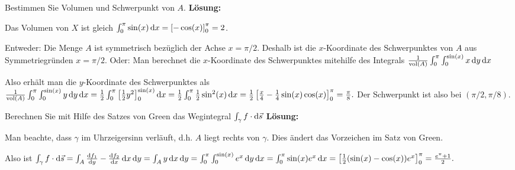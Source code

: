 \documentclass[a4paper,10pt]{article}
\begin{document}
Bestimmen Sie Volumen und Schwerpunkt von \( A \).
\textbf{Lösung:}
\begin{enumerate*}
    \item Das Volumen von \( X \) ist gleich \( \int_0^\pi \sin(x) \odif{x} = \left[ -\cos(x) \right]_0^\pi = 2 \).
    \item Entweder: Die Menge \( A \) ist symmetrisch bezüglich der Achse \( x = \pi / 2 \). Deshalb ist die \( x \)-Koordinate des Schwerpunktes von \( A \) aus Symmetriegründen \( x = \pi/2\).
    Oder: Man berechnet die \( x \)-Koordinate des Schwerpunktes mitehilfe des Integrals
    \(
        \frac{1}{\operatorname{vol}(A)} \int_0^\pi \int_0^{\sin(x)} x \odif{y, x}
    \)
    \item Also erhält man die \( y \)-Koordinate des Schwerpunktes als
    \(
        \frac{1}{\operatorname{vol}(A)} \int_0^\pi \int_0^{\sin(x)} y \odif{y, x} = \frac{1}{2} \int_0^\pi \left[ \frac{1}{2} y^2 \right]_0^{\sin(x)} \odif{x} = \frac{1}{2} \int_0^\pi \frac{1}{2} \sin^2(x) \odif{x} = \frac{1}{2} \left[ \frac{x}{4} - \frac{1}{4} \sin(x) \cos(x) \right]_0^\pi = \frac{\pi}{8} \text{.}
    \)
    Der Schwerpunkt ist also bei \( (\pi/2, \pi/8) \).
\end{enumerate*}

Berechnen Sie mit Hilfe des Satzes von Green das Wegintegral
\(
    \int_\gamma f \cdot \odif{\vec{s}}
\)
\textbf{Lösung:}
\begin{enumerate*}
    \item Man beachte, dass \( \gamma \) im Uhrzeigersinn verläuft, d.h. \( A \) liegt rechts von \( \gamma \). Dies ändert das Vorzeichen im Satz von Green.
    \item Also ist
    \(
        \int_\gamma f \cdot \odif{\vec{s}} = \int_A \odv{f_1}{y} - \odv{f_2}{x} \odif{x, y} = \int_A y \odif{x, y} = \int_0^\pi \int_0^{\sin(x)} e^x \odif{y, x} = \int_0^\pi \sin(x) e^x \odif{x} = \left[ \frac{1}{2}(\sin(x) - \cos(x)) e^x \right]_0^\pi = \frac{e^\pi + 1}{2} \text{.}
    \)
\end{enumerate*}
\end{document}
